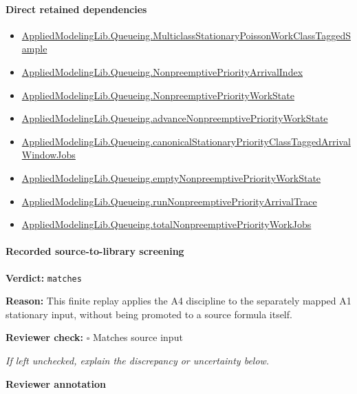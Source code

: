 \documentclass[10pt]{article}
\newcommand{\reviewerbox}{%
  \par\noindent\fbox{\parbox{0.96\linewidth}{\rule{0pt}{0.38in}}}\par
}
\newcommand{\reviewmatch}[1]{%
  \par\noindent\textbf{Reviewer check:} $\square$\; #1\par
  \noindent\emph{If left unchecked, explain the discrepancy or uncertainty below.}\par
}
\begin{document}
\paragraph{Direct retained dependencies}
\begin{itemize}\raggedright
\item \hyperlink{library-prerequisite-755cdb28ceaf46d2}{Applied\allowbreak{}Modeling\allowbreak{}Lib.\allowbreak{}Queueing.\allowbreak{}Multiclass\allowbreak{}Stationary\allowbreak{}Poisson\allowbreak{}Work\allowbreak{}Class\allowbreak{}Tagged\allowbreak{}Sample}
\item \hyperlink{governing-declaration-5d3724f4dc832d77}{Applied\allowbreak{}Modeling\allowbreak{}Lib.\allowbreak{}Queueing.\allowbreak{}Nonpreemptive\allowbreak{}Priority\allowbreak{}Arrival\allowbreak{}Index}
\item \hyperlink{library-prerequisite-e68cb5fce009ec53}{Applied\allowbreak{}Modeling\allowbreak{}Lib.\allowbreak{}Queueing.\allowbreak{}Nonpreemptive\allowbreak{}Priority\allowbreak{}Work\allowbreak{}State}
\item \hyperlink{library-prerequisite-96200a424cf39dee}{Applied\allowbreak{}Modeling\allowbreak{}Lib.\allowbreak{}Queueing.\allowbreak{}advance\allowbreak{}Nonpreemptive\allowbreak{}Priority\allowbreak{}Work\allowbreak{}State}
\item \hyperlink{governing-declaration-c8dff705756357c1}{Applied\allowbreak{}Modeling\allowbreak{}Lib.\allowbreak{}Queueing.\allowbreak{}canonical\allowbreak{}Stationary\allowbreak{}Priority\allowbreak{}Class\allowbreak{}Tagged\allowbreak{}Arrival\allowbreak{}Window\allowbreak{}Jobs}
\item \hyperlink{governing-declaration-0e2f4b9eb63fa294}{Applied\allowbreak{}Modeling\allowbreak{}Lib.\allowbreak{}Queueing.\allowbreak{}empty\allowbreak{}Nonpreemptive\allowbreak{}Priority\allowbreak{}Work\allowbreak{}State}
\item \hyperlink{library-prerequisite-74e6067041d9c8dc}{Applied\allowbreak{}Modeling\allowbreak{}Lib.\allowbreak{}Queueing.\allowbreak{}run\allowbreak{}Nonpreemptive\allowbreak{}Priority\allowbreak{}Arrival\allowbreak{}Trace}
\item \hyperlink{library-prerequisite-d49e277073e052d4}{Applied\allowbreak{}Modeling\allowbreak{}Lib.\allowbreak{}Queueing.\allowbreak{}total\allowbreak{}Nonpreemptive\allowbreak{}Priority\allowbreak{}Work\allowbreak{}Jobs}
\end{itemize}
\paragraph{Recorded source-to-library screening}
\textbf{Verdict:} \texttt{matches}
\\
{\raggedright
\textbf{Reason:} This finite replay applies the A4 discipline to the separately mapped A1 stationary input, without being promoted to a source formula itself.\allowbreak{}
\par}
\reviewmatch{Matches source input}
\noindent\textbf{Reviewer annotation}\par
\reviewerbox
\clearpage
\hypertarget{library-prerequisite-bb4b8c8010d5959b}{}
\end{document}
